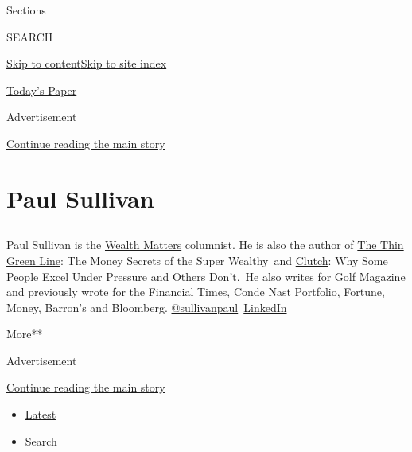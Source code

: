 Sections

SEARCH

\protect\hyperlink{site-content}{Skip to
content}\protect\hyperlink{site-index}{Skip to site index}

\href{https://myaccount.nytimes3xbfgragh.onion/auth/login?response_type=cookie\&client_id=vi}{}

\href{https://www.nytimes3xbfgragh.onion/section/todayspaper}{Today's
Paper}

Advertisement

\protect\hyperlink{after-top}{Continue reading the main story}

\hypertarget{paul-sullivan}{%
\section{Paul Sullivan}\label{paul-sullivan}}

\subsection{}

Paul Sullivan is the
\href{https://www.nytimes3xbfgragh.onion/column/wealth-matters?searchResultPosition=0}{Wealth
Matters} columnist. He is also the author of
\href{https://pauljsullivan.com/thin-green-line/praise/}{The Thin Green
Line}: The Money Secrets of the Super Wealthy~and
\href{https://pauljsullivan.com/clutch/}{Clutch}: Why Some People Excel
Under Pressure and Others Don't.~He also writes for Golf Magazine and
previously wrote for the Financial Times, Conde Nast Portfolio, Fortune,
Money, Barron's and Bloomberg.
\href{https://twitter.com/sullivanpaul}{@sullivanpaul}~\href{https://www.linkedin.com/in/sullivanpaulj/}{LinkedIn}

More**

Advertisement

\protect\hyperlink{after-mid1}{Continue reading the main story}

\begin{itemize}
\tightlist
\item
  \protect\hyperlink{stream-panel}{Latest}
\item
  Search
\end{itemize}

